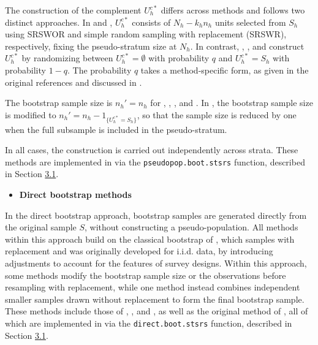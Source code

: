 The construction of the complement \(U_h^{c*}\) differs across methods and follows two distinct approaches. In \citet{Booth:Butler:Hall:1994} and \citet{Chao:Lo:1994}, \(U_h^{c*}\) consists of \(N_h - k_h n_h\) units selected from \(\textrm{$S$}_h\) using SRSWOR and simple random sampling with replacement (SRSWR), respectively, fixing the pseudo-stratum size at \(N_h\). In contrast, \citet{Bickel:Freedman:1984}, \citet{Chao:Lo:1985}, and \citet{Sitter:1992a} construct \(U_h^{c*}\) by randomizing between \(U_h^{c*} = \emptyset\) with probability \(q\) and \(U_h^{c*} = \textrm{$S$}_h\) with probability \(1 - q\). The probability \(q\) takes a method-specific form, as given in the original references and discussed in \citet{Mashreghi:Haziza:Leger:2016}.

The bootstrap sample size is \(n_h' = n_h\) for \citet{Booth:Butler:Hall:1994}, \citet{Chao:Lo:1994}, \citet{Bickel:Freedman:1984}, and \citet{Chao:Lo:1985}. In \citet{Sitter:1992a}, the bootstrap sample size is modified to \(n_h' = n_h - 1_{\{U_h^{c*} = \textrm{$S$}_h\}}\), so that the sample size is reduced by one when the full subsample is included in the pseudo-stratum.

In all cases, the construction is carried out independently across strata.
These methods are implemented in  via the \texttt{pseudopop.boot.stsrs} function, described in Section \hyperref[sec:pkgbootsurvsrs]{3.1}.

\begin{itemize}
\tightlist
\item
  \textbf{Direct bootstrap methods}
\end{itemize}

\noindent In the direct bootstrap approach, bootstrap samples are generated directly from the original sample \(\textrm{$S$}\), without constructing a pseudo-population. All methods within this approach build on the classical bootstrap of \citet{Efron:1979}, which samples with replacement and was originally developed for i.i.d. data, by introducing adjustments to account for the features of survey designs. Within this approach, some methods modify the bootstrap sample size or the observations before resampling with replacement, while one method instead combines independent smaller samples drawn without replacement to form the final bootstrap sample. These methods include those of \citet{McCarthy:Snowden:1985}, \citet{Rao:Wu:1988}, and \citet{Sitter:1992b}, as well as the original method of \citet{Efron:1979}, all of which are implemented in  via the \texttt{direct.boot.stsrs} function, described in Section \hyperref[sec:pkgbootsurvsrs]{3.1}.

